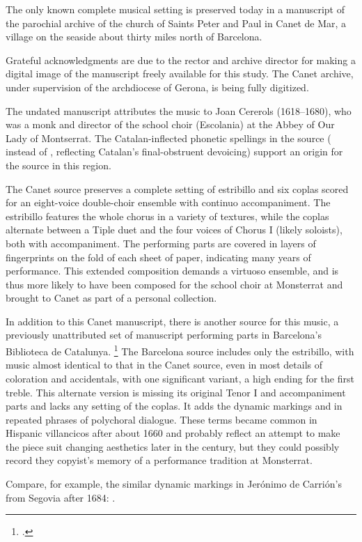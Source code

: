 
The only known complete musical setting is preserved today in a manuscript of
the parochial archive of the church of Saints Peter and Paul in Canet de Mar, a
village on the seaside about thirty miles north of Barcelona.%
\begin{Footnote}
    Grateful acknowledgments are due to the rector and archive director for
    making a digital image of the manuscript freely available for this study.
    The Canet archive, under supervision of the archdiocese of Gerona, is being
    fully digitized.
\end{Footnote}
The undated manuscript attributes the music to Joan Cererols (1618--1680), who
was a monk and director of the school choir (Escolania) at the Abbey of Our Lady
of Montserrat.%
    \Autocite{Bonastre:CanetCatalog}
The Catalan-inflected phonetic spellings in the source ( instead
of , reflecting Catalan's final-obstruent devoicing) support an
origin for the source in this region.%
    \Autocite{Myers:CatalanPhonology}


The Canet source preserves a complete setting of estribillo and six coplas
scored for an eight-voice double-choir ensemble with continuo accompaniment.
The estribillo features the whole chorus in a variety of textures, while the
coplas alternate between a Tiple duet and the four voices of Chorus I (likely
soloists), both with accompaniment.
The performing parts are covered in layers of fingerprints on the fold of each
sheet of paper, indicating many years of performance.
This extended composition demands a virtuoso ensemble, and is thus more likely
to have been composed for the school choir at Monsterrat and brought to Canet as
part of a personal collection.

In addition to this Canet manuscript, there is another source for this music, a
previously unattributed set of manuscript performing parts in Barcelona's
Biblioteca de Catalunya.%
    \footnote{.}
The Barcelona source includes only the estribillo, with music almost identical
to that in the Canet source, even in most details of coloration and accidentals,
with one significant variant, a  high ending for the first treble.
This alternate version is missing its original Tenor I and accompaniment parts
and lacks any setting of the coplas.
It adds the dynamic markings  and  in repeated phrases
of polychoral dialogue. 
These terms became common in Hispanic villancicos after about 1660 and probably
reflect an attempt to make the piece suit changing aesthetics later in the
century, but they could possibly record they copyist's memory of a performance
tradition at Monsterrat.%
\begin{Footnote}
    Compare, for example, the similar dynamic markings in Jerónimo de Carrión's
     from Segovia after 1684: 
    \autocite[331--336]{Cashner:PhD}.
\end{Footnote}

